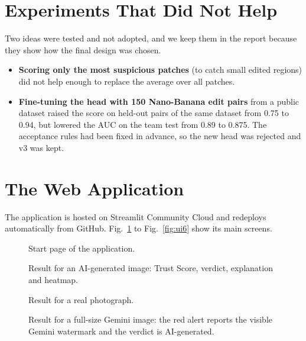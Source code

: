 \section{Experiments That Did Not Help}
Two ideas were tested and not adopted, and we keep them in the report because they show how the final design was chosen.
\begin{itemize}
  \item \textbf{Scoring only the most suspicious patches} (to catch small edited regions) did not help enough to replace the average over all patches.
  \item \textbf{Fine-tuning the head with 150 Nano-Banana edit pairs} from a public dataset raised the score on held-out pairs of the same dataset from 0.75 to 0.94, but lowered the AUC on the team test from 0.89 to 0.875. The acceptance rules had been fixed in advance, so the new head was rejected and v3 was kept.
\end{itemize}

\section{The Web Application}
The application is hosted on Streamlit Community Cloud and redeploys automatically from GitHub. Fig.~\ref{fig:ui1} to Fig.~\ref{fig:ui6} show its main screens.

\begin{figure}[htbp]
  \centering
  \caption{Start page of the application.}\label{fig:ui1}
\end{figure}

\begin{figure}[htbp]
  \centering
  \caption{Result for an AI-generated image: Trust Score, verdict, explanation and heatmap.}\label{fig:ui2}
\end{figure}

\begin{figure}[htbp]
  \centering
  \caption{Result for a real photograph.}\label{fig:ui3}
\end{figure}

\begin{figure}[htbp]
  \centering
  \caption{Result for a full-size Gemini image: the red alert reports the visible Gemini watermark and the verdict is AI-generated.}\label{fig:ui4}
\end{figure}

